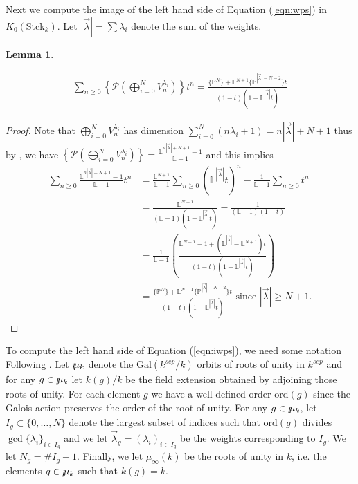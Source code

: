 \documentclass[a4paper,12pt]{amsart}
\newtheorem{lem}[thm]{Lemma}
\theoremstyle{definition}
\newcommand{\Bmu}{\mbox{$\raisebox{-0.59ex}
		{$l$}\hspace{-0.18em}\mu\hspace{-0.88em}\raisebox{-0.98ex}{\scalebox{2}
			{$\color{white}.$}}\hspace{-0.416em}\raisebox{+0.88ex}
		{$\color{white}.$}\hspace{0.46em}$}{}}
\newcommand{\Pc}{\mathcal{P}}
\newcommand{\Pb}{\mathbb{P}}
\newcommand{\Lb}{\mathbb{L}}
\begin{document}
	Next we compute the image of the left hand side of Equation (\ref{eqn:wps}) in $K_0(\mathrm{Stck}_k)$. 
	Let $|\vec{\lambda}| = \sum \lambda_i$ denote the sum of the weights. 
	\begin{lem}\label{cor:tbd6}
		
		\begin{align*}
			\sum_{n \ge 0} \left\{\Pc \left(\bigoplus_{i = 0}^N V_{n}^{\lambda_i} \right) \right\} t^n = \frac{ \{\Pb^N\} + \Lb^{N+1} \{\Pb^{|\vec{\lambda}|-N-2} \} t}{(1-t)(1-\Lb^{|\vec{\lambda}|}t)}
		\end{align*}
		
	\end{lem}
	
	
	\begin{proof} 
		
		Note that $\bigoplus_{i = 0}^N V_{n}^{\lambda_i}$ has dimension $\sum\limits_{i=0}^{N} (n\lambda_i + 1) = n|\vec{\lambda}| + N + 1$ thus by \cite[Prop. 1.1 iii)]{Ekedahl}, we have $\left\{\Pc \left(\bigoplus_{i = 0}^N V_{n}^{\lambda_i} \right) \right\} = \frac{\Lb^{n|\vec{\lambda}| + N + 1}-1}{\Lb-1}$ and this implies \\
		
		\begin{align*}
			\sum_{n \ge 0} \frac{\Lb^{n|\vec{\lambda}| + N + 1}-1}{\Lb-1} t^n &= \frac{\Lb^{N+1}}{\Lb-1} \sum_{n \ge 0} (\Lb^{|\vec{\lambda}|}t)^n - \frac{1}{\Lb-1} \sum_{n \ge 0} t^n\\
			&= \frac{\Lb^{N+1}}{(\Lb-1)(1-\Lb^{|\vec{\lambda}|}t)} - \frac{1}{(\Lb-1)(1-t)} \\
			&= \frac{1}{\Lb-1} \left( \frac{ \Lb^{N+1} - 1 + (\Lb^{|\vec{\lambda}|} - \Lb^{N+1})t }{(1-t)(1-\Lb^{|\vec{\lambda}|}t)} \right) \\
			&= \frac{ \{\Pb^N\} + \Lb^{N+1} \{\Pb^{|\vec{\lambda}|-N-2} \} t}{(1-t)(1-\Lb^{|\vec{\lambda}|}t)}  \text{ since $|\vec{\lambda}| \ge N+1$.}
		\end{align*}
		
	\end{proof}
	
	To compute the left hand side of Equation (\ref{eqn:iwps}), we need some notation Following \cite[Sec. 3]{HP2}. Let $\Bmu_k$ denote the $\mathrm{Gal}(k^{sep}/k)$ orbits of roots of unity in $k^{sep}$ and for any $g \in \Bmu_k$ let $k(g)/k$ be the field extension obtained by adjoining those roots of unity. For each element $g$ we have a well defined order $\mathrm{ord}(g)$ since the Galois action preserves the order of the root of unity. For any $g \in \Bmu_k$, let $I_g \subset \{0, \ldots, N\}$ denote the largest subset of indices such that $\mathrm{ord}(g)$ divides $\gcd\{\lambda_i\}_{i \in I_g}$ and we let $\vec{\lambda}_g = (\lambda_i)_{i \in I_g}$ be the weights corresponding to $I_g$. We let $N_g = \# I_g - 1$. Finally, we let $\mu_\infty(k)$ be the roots of unity in $k$, i.e. the elements $g \in \Bmu_k$ such that $k(g) = k$. 
	
\end{document}
